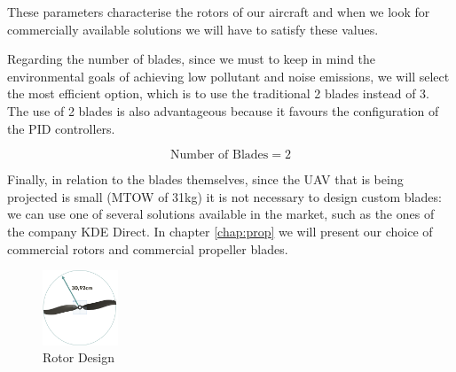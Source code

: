 \documentclass[english,fira]{ist-report}
\begin{document}
These parameters characterise the rotors of our aircraft and when we look for commercially available solutions we will have to satisfy these values. \par
Regarding the number of blades, since we must to keep in mind the environmental goals of achieving low pollutant and noise emissions, we will select the most efficient option, which is to use the traditional 2 blades instead of 3. The use of 2 blades is also advantageous because it favours the configuration of the PID controllers.

\begin{equation*}
    \text{Number of Blades}=2
\end{equation*}

Finally, in relation to the blades themselves, since the UAV that is being projected is small (MTOW of 31kg) it is not necessary to design custom blades: we can use one of several solutions available in the market, such as the ones of the company KDE Direct. In chapter \ref{chap:prop} we will present our choice of commercial rotors and commercial propeller blades. 

\begin{figure}[ht]
    \centering
    \includegraphics[width=0.2\textwidth]{graphics/WingDesign/rotordesign.png}
    \caption{Rotor Design}
    \label{fig:rotordesign}
\end{figure}
\end{document}
